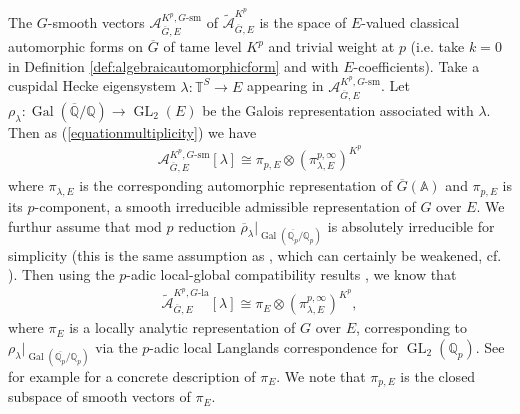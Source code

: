 \documentclass{article}
\theoremstyle{definition}
\def\calA{\mathcal{A}}
\def\bbA{\mathbb{A}}
\def\bbQ{\mathbb{Q}}
\def\bbT{\mathbb{T}}
\def\isom{\cong}
\DeclareMathOperator{\Gal}{Gal}
\DeclareMathOperator{\GL}{GL}
\def\lan{\mathrm{la}}
\def\sm{\mathrm{sm}}
\def\bar{\overline}
\def\tilde{\widetilde}
\def\-{\text{-}}
\def\-{\text{-}}
\begin{document}
The $G$-smooth vectors $\calA^{K^p,G\-\sm}_{\bar G,E}$ of $\tilde{\calA}^{K^p}_{\bar G,E}$ is the space of $E$-valued classical automorphic forms on $\bar G$ of tame level $K^p$ and trivial weight at $p$ (i.e. take $k=0$ in Definition \ref{def:algebraicautomorphicform} and with $E$-coefficients). Take a cuspidal Hecke eigensystem $\lambda:\bbT^S\rightarrow E$ appearing in $\calA^{K^p,G\-\sm}_{\bar G,E}$. Let $\rho_{\lambda}:\Gal(\overline{\bbQ}/\bbQ)\rightarrow\GL_2(E)$ be the Galois representation associated with $\lambda$. Then as (\ref{equationmultiplicity}) we have
\begin{align*}
    \calA^{K^p,G\-\sm}_{\bar G,E}[\lambda]\isom \pi_{p,E}\otimes (\pi_{\lambda,E}^{p,\infty})^{K^p} 
\end{align*}
where $\pi_{\lambda,E}$ is the corresponding automorphic representation of $\bar G(\bbA)$ and $\pi_{p,E}$ is its $p$-component, a smooth irreducible admissible representation of $G$ over $E$. We furthur assume that mod $p$ reduction $\bar\rho_{\lambda}|_{\Gal(\overline{\bbQ_p}/\bbQ_p)}$ is absolutely irreducible for simplicity (this is the same assumption as \cite[\S 5.1, Hypoth\'ese]{DLB17}, which can certainly be weakened, cf. \cite[Corollary 5.7]{pavskunas2022some}). Then using the $p$-adic local-global compatibility results \cite{emerton2011local,DLB17}, we know that
\begin{align}\label{equationeigenspacecompletedbarG}
    \tilde{\calA}^{K^p,G\-\lan}_{\bar G,E}[\lambda]\isom \pi_E\otimes (\pi_{\lambda,E}^{p,\infty})^{K^p} ,
\end{align}
where $\pi_E$ is a locally analytic representation of $G$ over $E$, corresponding to $\rho_{\lambda}|_{\Gal(\overline{\bbQ_p}/\bbQ_p)}$ via the $p$-adic local Langlands correspondence for $\GL_2(\bbQ_p)$. See for example \cite[\S 7.3]{PanII} for a concrete description of $\pi_E$. We note that $\pi_{p,E}$ is the closed subspace of smooth vectors of $\pi_E$.
\end{document}
